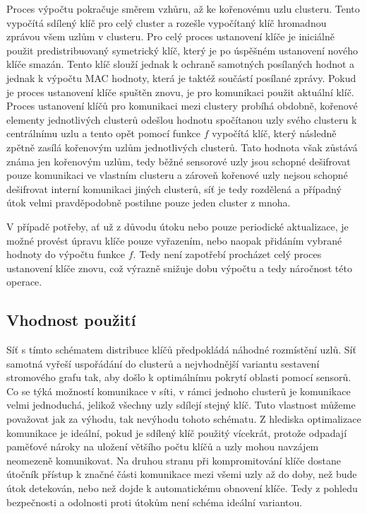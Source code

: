 \documentclass[11pt,final,twoside]{fithesis2}
\begin{document}
Proces výpočtu pokračuje směrem vzhůru, až ke kořenovému uzlu clusteru. Tento vypočítá sdílený klíč pro celý cluster a rozešle vypočítaný klíč hromadnou zprávou všem uzlům v clusteru. 
Pro celý proces ustanovení klíče je iniciálně použit predistribuovaný symetrický klíč, který je po úspěšném ustanovení nového klíče smazán. Tento klíč slouží jednak k ochraně samotných posílaných 
hodnot a jednak k výpočtu MAC hodnoty, která je taktéž součástí posílané zprávy. Pokud je proces ustanovení klíče spuštěn znovu, je pro komunikaci použit aktuální klíč. Proces ustanovení klíčů pro 
komunikaci mezi clustery probíhá obdobně, kořenové elementy jednotlivých clusterů odešlou hodnotu spočítanou uzly svého clusteru k centrálnímu uzlu a tento opět pomocí funkce $f$ vypočítá klíč, který 
následně zpětně zasílá kořenovým uzlům jednotlivých clusterů. Tato hodnota však zůstává známa jen kořenovým uzlům, tedy běžné sensorové uzly jsou schopné dešifrovat pouze komunikaci ve vlastním clusteru
a zároveň kořenové uzly nejsou schopné dešifrovat interní komunikaci jiných clusterů, síť je tedy rozdělená a případný útok velmi pravděpodobně postihne pouze jeden cluster z mnoha. 

V případě potřeby, ať už z důvodu útoku nebo pouze periodické aktualizace, je možné provést úpravu klíče pouze vyřazením, nebo naopak přidáním vybrané hodnoty do výpočtu funkce $f$. Tedy není zapotřebí
procházet celý proces ustanovení klíče znovu, což výrazně snižuje dobu výpočtu a tedy náročnost této operace. 

\subsection{Vhodnost použití}

Síť s tímto schématem distribuce klíčů předpokládá náhodné rozmístění uzlů. Síť samotná vyřeší uspořádání do clusterů a nejvhodnější 
variantu sestavení stromového grafu tak, aby došlo k optimálnímu pokrytí oblasti pomocí sensorů. Co se týká možností komunikace
v síti, v rámci jednoho clusterů je komunikace velmi jednoduchá, jelikož všechny uzly sdílejí stejný klíč. Tuto vlastnost můžeme považovat 
jak za výhodu, tak nevýhodu tohoto schématu. Z hlediska optimalizace komunikace je ideální, pokud je sdílený klíč použitý vícekrát, 
protože odpadají paměťové nároky na uložení většího počtu klíčů a uzly mohou navzájem neomezeně komunikovat. Na druhou stranu při 
kompromitování klíče dostane útočník přístup k značné části komunikace mezi všemi uzly až do doby, než bude útok detekován, nebo než 
dojde k automatickému obnovení klíče. Tedy z pohledu bezpečnosti a odolnosti proti útokům není schéma ideální variantou. 
\end{document}

